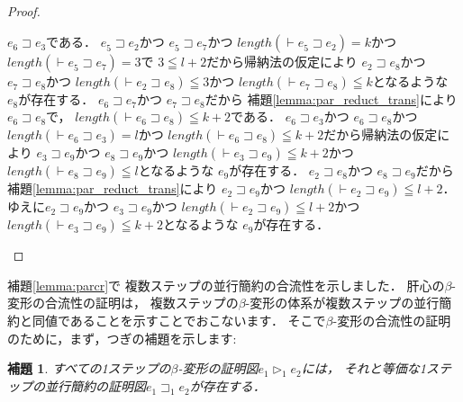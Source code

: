 \documentclass{ltjsbook}%
\newtheorem{lemma}{補題}[section]%
\newcommand\lemmaname{補題}%
\begin{document}
\begin{proof}
\begin{itemize}
    $\mathit{e}_6^{}\sqsupset\mathit{e}_3^{}$である．%
    $\mathit{e}_5^{}\sqsupset\mathit{e}_2^{}$かつ%
    $\mathit{e}_5^{}\sqsupset\mathit{e}_7^{}$かつ%
    $length(\vdash\mathit{e}_5^{}\sqsupset\mathit{e}_2^{})=k$かつ%
    $length(\vdash\mathit{e}_5^{}\sqsupset\mathit{e}_7^{})=3$で%
    $3 \leqq l+2$だから帰納法の仮定により%
    $\mathit{e}_2^{}\sqsupset\mathit{e}_8^{}$かつ%
    $\mathit{e}_7^{}\sqsupset\mathit{e}_8^{}$かつ%
    $length(\vdash\mathit{e}_2^{}\sqsupset\mathit{e}_8^{})\leqq 3$かつ%
    $length(\vdash\mathit{e}_7^{}\sqsupset\mathit{e}_8^{})\leqq k$となるような%
    $\mathit{e}_8^{}$が存在する．%
    $\mathit{e}_6^{}\sqsupset\mathit{e}_7^{}$かつ%
    $\mathit{e}_7^{}\sqsupset\mathit{e}_8^{}$だから%
    \lemmaname\ref{lemma:par_reduct_trans}により%
    $\mathit{e}_6^{}\sqsupset\mathit{e}_8^{}$で，%
    $length(\vdash\mathit{e}_6^{}\sqsupset\mathit{e}_8^{})\leqq k+2$である．%
    $\mathit{e}_6^{}\sqsupset\mathit{e}_3^{}$かつ%
    $\mathit{e}_6^{}\sqsupset\mathit{e}_8^{}$かつ%
    $length(\vdash\mathit{e}_6^{}\sqsupset\mathit{e}_3^{})=l$かつ%
    $length(\vdash\mathit{e}_6^{}\sqsupset\mathit{e}_8^{})\leqq k+2$だから帰納法の仮定により%
    $\mathit{e}_3^{}\sqsupset\mathit{e}_9^{}$かつ%
    $\mathit{e}_8^{}\sqsupset\mathit{e}_9^{}$かつ%
    $length(\vdash\mathit{e}_3^{}\sqsupset\mathit{e}_9^{})\leqq k+2$かつ%
    $length(\vdash\mathit{e}_8^{}\sqsupset\mathit{e}_9^{})\leqq l$となるような%
    $\mathit{e}_9^{}$が存在する．%
    $\mathit{e}_2^{}\sqsupset\mathit{e}_8^{}$かつ%
    $\mathit{e}_8^{}\sqsupset\mathit{e}_9^{}$だから%
    \lemmaname\ref{lemma:par_reduct_trans}により%
    $\mathit{e}_2^{}\sqsupset\mathit{e}_9^{}$かつ%
    $length(\vdash\mathit{e}_2^{}\sqsupset\mathit{e}_9^{})\leqq l+2$．%
    ゆえに$\mathit{e}_2^{}\sqsupset\mathit{e}_9^{}$かつ%
    $\mathit{e}_3^{}\sqsupset\mathit{e}_9^{}$かつ%
    $length(\vdash\mathit{e}_2^{}\sqsupset\mathit{e}_9^{})\leqq l+2$かつ%
    $length(\vdash\mathit{e}_3^{}\sqsupset\mathit{e}_9^{})\leqq k+2$となるような%
    $\mathit{e}_9^{}$が存在する．%
  \end{itemize}%
\end{proof}%
\par\lemmaname\ref{lemma:parcr}で%
複数ステップの並行簡約の合流性を示しました．%
肝心の$\beta$-変形の合流性の証明は，%
複数ステップの$\beta$-変形の体系が複数ステップの並行簡約と同値であることを示すことでおこないます．%
そこで$\beta$-変形の合流性の証明のために，まず，つぎの補題を示します:%
\begin{lemma}%
  \label{lemma:beta1par1}%
  すべての1ステップの$\beta$-変形の証明図$\mathit{e}_1^{}\triangleright_1^{}\mathit{e}_2^{}$には，%
  それと等価な1ステップの並行簡約の証明図$\mathit{e}_1^{}\sqsupset_1^{}\mathit{e}_2^{}$が存在する．%
\end{lemma}%
\end{document}
